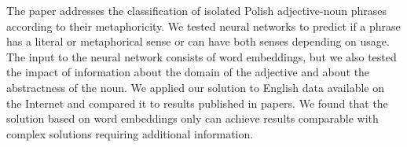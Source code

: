 The paper addresses the classification of isolated Polish  adjective-noun phrases according to their metaphoricity. We tested neural networks to predict if a phrase has a literal or metaphorical sense or can have both senses depending on usage. The input to the neural network consists of word embeddings, but we also tested the impact of information about the  domain of the adjective and about the abstractness of the noun.  We applied our solution to English data available on the Internet and compared it to  results published in papers. We found that the solution based on word embeddings only can achieve results comparable with complex solutions requiring additional information.
